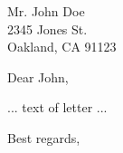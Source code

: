   \signature{Your Name}
  \address{Return address}
  \renewcommand{\today}{Month day, year}
  
    \begin{letter}
{Mr. John Doe \\ 2345 Jones St.
\\ Oakland, CA  91123}
\opening{Dear John,}
...
text of letter
...
      \closing{Best regards,}
    \end{letter}
  
